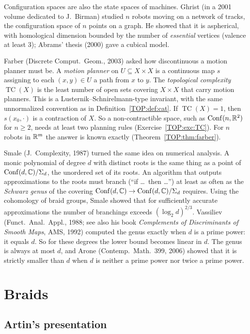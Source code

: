 Configuration spaces are also the state spaces of machines. Ghrist (in a 2001 volume dedicated to
J.~Birman) studied $n$ robots moving on a network of tracks, the configuration space of $n$ points on a
graph. He showed that it is aspherical, with homological dimension bounded by the number of
\emph{essential} vertices (valence at least $3$); Abrams' thesis (2000) gave a cubical model.

Farber (Discrete Comput.\ Geom., 2003) asked how discontinuous a motion planner must be. A
\emph{motion planner} on $U\subseteq X\times X$ is a continuous map $s$ assigning to each $(x,y)\in U$ a path from $x$
to $y$. The \emph{topological complexity} $\operatorname{TC}(X)$ is the least number of open sets covering
$X\times X$ that carry motion planners. This is a Lusternik--Schnirelmann-type invariant, with the same
unnormalized convention as in Definition~\ref{TOP:def:cat}. If $\operatorname{TC}(X)=1$, then
$s(x_0,\cdot)$ is a contraction of $X$. So a non-contractible space, such as $\operatorname{Conf}(n,\mathbb{R}^2)$ for $n\ge2$,
needs at least two planning rules (Exercise~\ref{TOP:exc:TC}). For $n$ robots
in $\mathbb{R}^m$ the answer is known exactly (Theorem~\ref{TOP:thm:farber}).

Smale (J.\ Complexity, 1987) turned the same idea on numerical analysis. A monic polynomial of degree $d$
with distinct roots is the same thing as a point of $\operatorname{Conf}(d,\mathbb{C})/\Sigma_d$, the unordered set of its roots.
An algorithm that outputs approximations to the roots must branch (``if \dots\ then \dots'') at least as often as the
\emph{Schwarz genus} of the covering $\operatorname{Conf}(d,\mathbb{C})\to\operatorname{Conf}(d,\mathbb{C})/\Sigma_d$ requires. Using the
cohomology of braid groups, Smale showed that for sufficiently accurate approximations the number of
branchings exceeds $(\log_2d)^{2/3}$. Vassiliev
(Funct.\ Anal.\ Appl., 1988; see also his book \emph{Complements of Discriminants of Smooth Maps}, AMS, 1992)
computed the genus exactly when $d$ is a prime power: it equals $d$. So for these degrees the lower bound
becomes linear in $d$. The genus is always at most $d$, and Arone (Contemp.\ Math.\ 399, 2006) showed
that it is strictly smaller than $d$ when $d$ is neither a prime power nor twice a prime power.

\section{Braids}
\label{TOP:sec:braids}

\subsection{Artin's presentation}

